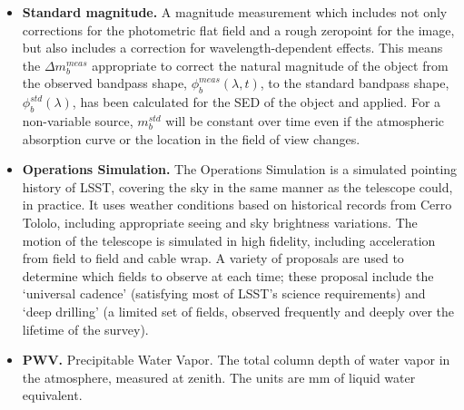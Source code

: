 \documentclass[12pt,preprint]{aastex}
\begin{document}
\begin{itemize}
\item{{\bf Standard magnitude.} A magnitude measurement which includes
  not only corrections for the photometric flat field and a rough
  zeropoint for the image, but also includes a correction for
  wavelength-dependent effects. This means the $\Delta m_b^{meas}$
  appropriate to correct the natural magnitude of the object from the
  observed bandpass shape,  $\phi_b^{meas}(\lambda,t)$, to the
  standard bandpass shape, $\phi_b^{std}(\lambda)$, has been
  calculated for the SED of the object and applied.  For a
  non-variable source, $m_b^{std}$ will be constant over time even if
  the atmospheric absorption curve or the location in the field of
  view changes.}

\item{{\bf Operations Simulation.} The Operations Simulation is a
simulated pointing history of LSST, covering the sky in the same
manner as the telescope could, in practice. It uses weather conditions
based on historical records from Cerro Tololo, including appropriate
seeing and sky brightness variations. The motion of the telescope is
simulated in high fidelity, including acceleration from field to field
and cable wrap.  A variety of proposals are used to determine which
fields to observe at each time; these proposal include the `universal
cadence' (satisfying most of LSST's science requirements) and `deep
drilling' (a limited set of fields, observed frequently and deeply
over the lifetime of the survey). }

\item{{\bf PWV.} Precipitable Water Vapor.  The total column depth of water vapor in the atmosphere, measured 
at zenith.  The units are mm of liquid water equivalent. }

\end{itemize}
\end{document}
